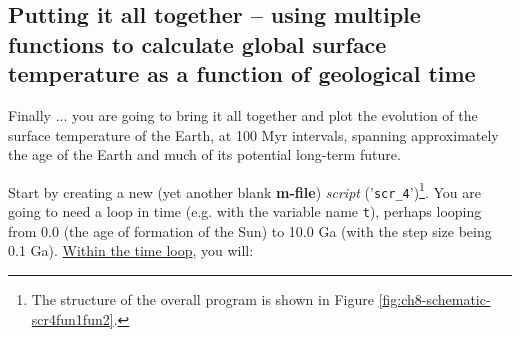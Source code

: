 \documentclass{tufte-book} %
\begin{document}

\newpage

\subsection{Putting it all together -- using multiple functions to calculate global surface temperature as a function of geological time}

Finally ... you are going to bring it all together and plot the evolution of the surface temperature of the Earth, at 100 Myr intervals,  spanning approximately the age of the Earth and much of its potential long-term future.

Start by creating a new (yet another blank \textbf{m-file}) \textit{script} ('\texttt{scr\_4}')\footnote{The structure of the overall program is shown in  Figure \ref{fig:ch8-schematic-scr4fun1fun2}.}. You are going to need a loop in time (e.g. with the variable name \texttt{t}), perhaps looping from 0.0 (the age of formation of the Sun) to 10.0 Ga (with the step size being 0.1 Ga). \uline{Within the time loop}, you will:
\end{document}
